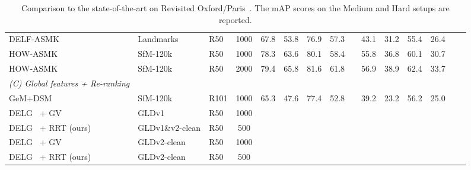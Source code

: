 \begin{table*}[t]
{{\begin{tabular}{l l l c c c c c c c c c c c c }
DELF-ASMK\cite{rasmk2019} & Landmarks & R50 & 1000 & \num{67.8}  & \num{53.8} & \num{76.9} & \num{57.3} && \num{43.1} & \num{31.2} & \num{55.4} & \num{26.4} \\
    HOW-ASMK\cite{how2020} & SfM-120k & R50 & 1000 & \num{78.3}  & \num{63.6} & \num{80.1} & \num{58.4} && \num{55.8} & \num{36.8} & \num{60.1} & \num{30.7} \\ 
    HOW-ASMK\cite{how2020} & SfM-120k & R50 & 2000 & \num[math-rm=\mathbf]{79.4}  & \num{65.8} & \num{81.6} & \num{61.8} && \num{56.9} & \num{38.9} & \num{62.4} & \num{33.7} \\ 
    \midrule
    { \textit{(C) Global features + Re-ranking} }\\


    GeM+DSM \cite{dsm2019} & SfM-120k& R101 & 1000 & \num{65.3} & \num{47.6} & \num{77.4} & \num{52.8} &&  \num{39.2} & \num{23.2} & \num{56.2} & \num{25.0} \\
    
    DELG~\cite{delg2020} + GV & GLDv1 & R50 & 1000 &  & &  &  &&  &  &  &  \\
    
    DELG~\cite{delg2020} + RRT (ours) & GLDv1\&v2-clean & R50 & 500 &  & &  &  &&  &  &  &  \\ 
    
    DELG~\cite{delg2020} + GV & GLDv2-clean & R50 & 1000 &  &  &  &  &&  &  &  &  \\
    
    DELG~\cite{delg2020} + RRT (ours) & GLDv2-clean & R50 & 500 &  &  &  &  &&  &  &  &  \\ 
    
    \bottomrule
    \end{tabular}
    }
}
\caption{Comparison to the state-of-the-art on Revisited Oxford/Paris~\cite{revisited}. The mAP scores on the Medium and Hard setups are reported.
\vspace{-0.1in}
}
\label{tab:sota}
\end{table*}


